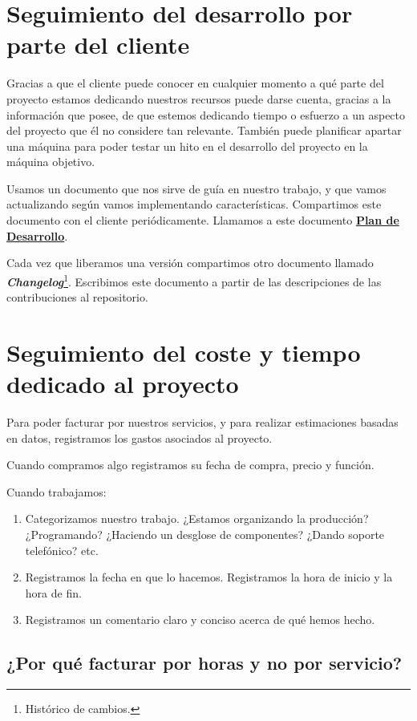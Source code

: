 \section{Seguimiento del desarrollo por parte del cliente}

Gracias a que el cliente puede conocer en cualquier momento a qué 
parte del proyecto estamos dedicando nuestros recursos puede darse cuenta,
gracias a la información que posee, de que estemos dedicando tiempo
o esfuerzo a un aspecto del proyecto que él no considere tan
relevante. También puede planificar apartar una máquina para poder
testar un hito en el desarrollo del proyecto en la máquina objetivo.

Usamos un documento que nos sirve de guía en nuestro trabajo, y que
vamos actualizando según vamos implementando características.
Compartimos este documento con el cliente periódicamente.
Llamamos a este documento \hyperref[sec:plan_de_desarrollo]{\textbf{Plan de Desarrollo}}.

Cada vez que liberamos una versión compartimos otro documento llamado
\textit{\textbf{Changelog}}\footnote{Histórico de cambios.}. Escribimos
este documento a partir de las descripciones de las contribuciones al
repositorio.

\section{Seguimiento del coste y tiempo dedicado al proyecto}

Para poder facturar por nuestros servicios, y para realizar estimaciones
basadas en datos, registramos los gastos asociados al proyecto.

Cuando compramos algo registramos su fecha de compra, precio y función.

Cuando trabajamos:
\begin{enumerate}
    \item Categorizamos nuestro trabajo. ¿Estamos organizando la producción?
          ¿Programando? ¿Haciendo un desglose de componentes? ¿Dando soporte
          telefónico? etc.
    \item Registramos la fecha en que lo hacemos. Registramos la hora de inicio
          y la hora de fin.
    \item Registramos un comentario claro y conciso acerca de qué hemos hecho.
\end{enumerate}

\subsection{¿Por qué facturar por horas y no por servicio?}

